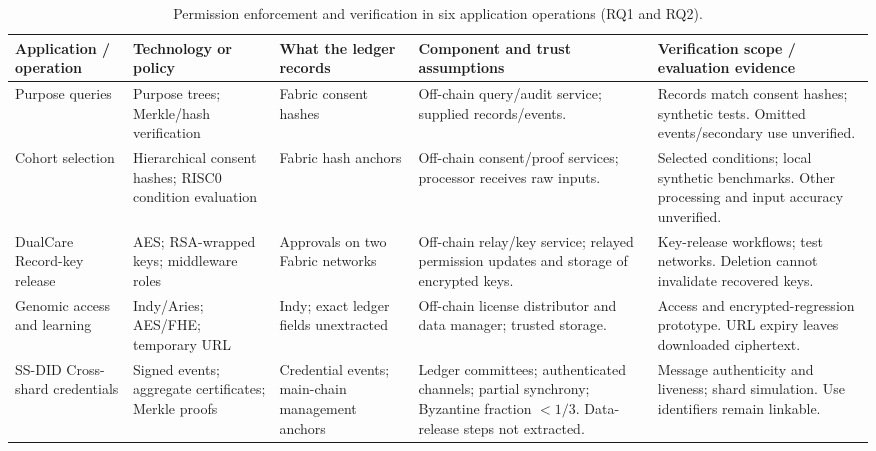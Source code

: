 \begin{table}[htbp]
\setlength{\tabcolsep}{2pt}
\centering
\footnotesize
\caption{Permission enforcement and verification in six application operations (RQ1 and RQ2).}
\label{tab:worked-control-comparisons}
\begin{tabular}{@{}>{\raggedright\arraybackslash}m{}>{\raggedright\arraybackslash}m{}>{\raggedright\arraybackslash}m{}>{\raggedright\arraybackslash}m{}>{\raggedright\arraybackslash}m{}@{}}
\toprule
Application / operation & Technology or policy & What the ledger records & Component and trust assumptions & Verification scope / evaluation evidence \\
\midrule
\citet{updateCan2024AuditableConsent}\newline Purpose queries & Purpose trees; Merkle/hash verification & Fabric consent hashes & Off-chain query/audit service; supplied records/events. & Records match consent hashes; synthetic tests. Omitted events/secondary use unverified. \\
\addlinespace[5pt]
\citet{updateGupta2026ScalableConsent}\newline Cohort selection & Hierarchical consent hashes; RISC0 condition evaluation & Fabric hash anchors & Off-chain consent/proof services; processor receives raw inputs. & Selected conditions; local synthetic benchmarks. Other processing and input accuracy unverified. \\
\addlinespace[5pt]
DualCare \cite{updateHemlata2026DualCare}\newline Record-key release & AES; RSA-wrapped keys; middleware roles & Approvals on two Fabric networks & Off-chain relay/key service; relayed permission updates and storage of encrypted keys. & Key-release workflows; test networks. Deletion cannot invalidate recovered keys. \\
\addlinespace[5pt]
\citet{2021-did-prevent-secondary}\newline Genomic access and learning & Indy/Aries; AES/FHE; temporary URL & Indy; exact ledger fields unextracted & Off-chain license distributor and data manager; trusted storage. & Access and encrypted-regression prototype. URL expiry leaves downloaded ciphertext. \\
\addlinespace[5pt]
SS-DID \cite{updateLiu2024SSDID}\newline Cross-shard credentials & Signed events; aggregate certificates; Merkle proofs & Credential events; main-chain management anchors & Ledger committees; authenticated channels; partial synchrony; Byzantine fraction $<1/3$. Data-release steps not extracted. & Message authenticity and liveness; shard simulation. Use identifiers remain linkable. \\

\end{tabular}
\end{table}
